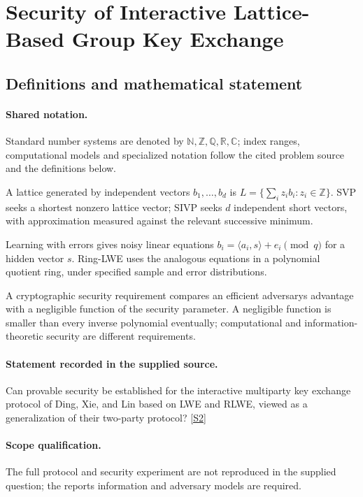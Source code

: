 \documentclass[11pt]{article}
\newcommand{\sref}[2]{\hyperlink{source:#1:#2}{[S#2]}}
\begin{document}
\section{Security of Interactive Lattice-Based Group Key Exchange}\label{statement}

\subsection{Definitions and mathematical statement}

\paragraph{Shared notation.}Standard number systems are denoted by $\mathbb N,\mathbb Z,\mathbb Q,\mathbb R,\mathbb C$; index ranges, computational models and specialized notation follow the cited problem source and the definitions below.


A lattice generated by independent vectors $b_1,\ldots,b_d$ is $L=\{\sum_i z_i b_i:z_i\in\mathbb Z\}$. SVP seeks a shortest nonzero lattice vector; SIVP seeks $d$ independent short vectors, with approximation measured against the relevant successive minimum.

Learning with errors gives noisy linear equations $b_i=\langle a_i,s\rangle+e_i\pmod q$ for a hidden vector $s$. Ring-LWE uses the analogous equations in a polynomial quotient ring, under specified sample and error distributions.

A cryptographic security requirement compares an efficient adversary\textquotesingle s advantage with a negligible function of the security parameter. A negligible function is smaller than every inverse polynomial eventually; computational and information-theoretic security are different requirements.
\paragraph{Statement recorded in the supplied source.}
Can provable security be established for the interactive multiparty key exchange protocol of Ding, Xie, and Lin based on LWE and RLWE, viewed as a generalization of their two-party protocol? \sref{statement}{2}
\paragraph{Scope qualification.}
The full protocol and security experiment are not reproduced in the supplied question; the report\textquotesingle s information and adversary models are required.
\end{document}
